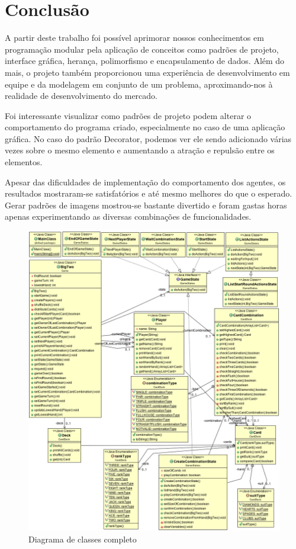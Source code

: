 \documentclass[12pt]{article}
\begin{document}
\section{Conclusão}
\label{conclusao}
A partir deste trabalho foi possível aprimorar nossos conhecimentos em programação modular pela aplicação de conceitos como padrões de projeto, interface gráfica, herança, polimorfismo e encapsulamento de dados. Além do mais, o projeto também proporcionou uma experiência de desenvolvimento em equipe e da modelagem em conjunto de um problema, aproximando-nos à realidade de desenvolvimento do mercado.

Foi interessante visualizar como padrões de projeto podem alterar o comportamento do programa criado, especialmente no caso de uma aplicação gráfica. No caso do padrão Decorator, podemos ver ele sendo adicionado várias vezes sobre o mesmo elemento e aumentando a atração e repulsão entre os elementos.

Apesar das dificuldades de implementação do comportamento dos agentes, os resultados mostraram-se satisfatórios e até mesmo melhores do que o esperado. Gerar padrões de imagens mostrou-se bastante divertido e foram gastas horas apenas experimentando as diversas combinações de funcionalidades.




\begin{figure}[h!]
	\centering
	\includegraphics[width=.8\textwidth]{umlfull.png}
	\caption{Diagrama de classes completo}
	\label{umlfull}
\end{figure}
\end{document}
